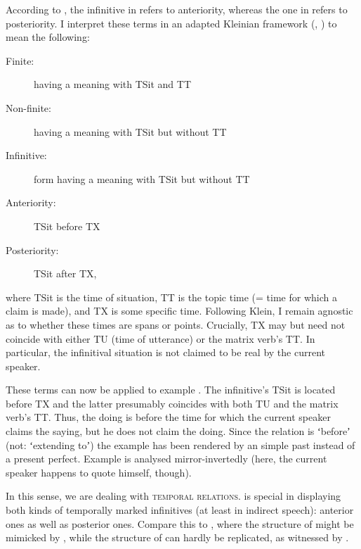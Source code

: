 \documentclass[output=paper,hidelinks]{langscibook}
\begin{document}
According to \citet[268]{Kavčič2016}, the infinitive in  refers to anteriority, where\-as the one in   refers to posteriority. I interpret these terms in an adapted Kleinian framework (\citealt{Klein1994}, \citealt[305]{Reiner2019}) to mean the following:

\begin{description}
\item[Finite:]     	having a meaning with TSit and TT
\item[Non-finite:]     having a meaning with TSit but without TT 
\item[Infinitive:]     form having a meaning with TSit but without TT
\item[Anteriority:]	TSit before TX 
\item[Posteriority:]   TSit after TX,
\end{description}
where TSit is the time of situation, TT is the topic time (= time for which a claim is made), and TX is some specific time. Following Klein, I remain agnostic as to whether these times are spans or points. Crucially, TX may but need not coincide with either TU (time of utterance) or the matrix verb’s TT. In particular, the infinitival situation is not claimed to be real by the current speaker.

These terms can now be applied to example . The infinitive’s TSit is located before TX and the latter presumably coincides with both TU and the matrix verb’s TT. Thus, the doing is before the time for which the current speaker claims the saying, but he does not claim the doing. Since the relation is ʻbeforeʼ (not: ʻextending toʼ) the example has been rendered by an  simple past instead of a present perfect. Example  is analysed mirror-invertedly (here, the current speaker happens to quote himself, though).

In this sense, we are dealing with \textsc{temporal relations}.  is special in displaying both kinds of temporally marked infinitives (at least in indirect speech): anterior ones as well as posterior ones. Compare this to , where the structure of  might be mimicked by , while the structure of  can hardly be replicated, as witnessed by .

\z
\end{document}
